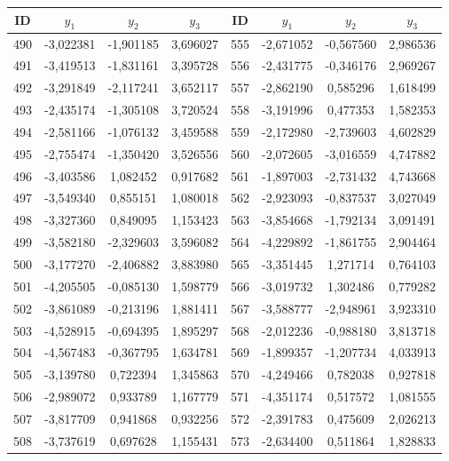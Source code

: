 \begin{apendicesenv}
\begin{table}[H]
	\centering
	\scriptsize
	\begin{tabular}{c c c c c c c c}
		\toprule
		 \centering \textbf{ID} & $y_1$ & $y_2$ & $y_3$ & \textbf{ID} & $y_1$ & $y_2$ & $y_3$ \\
		\midrule
		490 & -3,022381 & -1,901185 & 3,696027 & 555 & -2,671052 & -0,567560 & 2,986536 \\
		491 & -3,419513 & -1,831161 & 3,395728 & 556 & -2,431775 & -0,346176 & 2,969267 \\
		492 & -3,291849 & -2,117241 & 3,652117 & 557 & -2,862190 & 0,585296 & 1,618499 \\
		493 & -2,435174 & -1,305108 & 3,720524 & 558 & -3,191996 & 0,477353 & 1,582353 \\
		494 & -2,581166 & -1,076132 & 3,459588 & 559 & -2,172980 & -2,739603 & 4,602829 \\
		495 & -2,755474 & -1,350420 & 3,526556 & 560 & -2,072605 & -3,016559 & 4,747882 \\
		496 & -3,403586 & 1,082452 & 0,917682 & 561 & -1,897003 & -2,731432 & 4,743668 \\
		497 & -3,549340 & 0,855151 & 1,080018 & 562 & -2,923093 & -0,837537 & 3,027049 \\
		498 & -3,327360 & 0,849095 & 1,153423 & 563 & -3,854668 & -1,792134 & 3,091491 \\
		499 & -3,582180 & -2,329603 & 3,596082 & 564 & -4,229892 & -1,861755 & 2,904464 \\
		500 & -3,177270 & -2,406882 & 3,883980 & 565 & -3,351445 & 1,271714 & 0,764103 \\
		501 & -4,205505 & -0,085130 & 1,598779 & 566 & -3,019732 & 1,302486 & 0,779282 \\
		502 & -3,861089 & -0,213196 & 1,881411 & 567 & -3,588777 & -2,948961 & 3,923310 \\
		503 & -4,528915 & -0,694395 & 1,895297 & 568 & -2,012236 & -0,988180 & 3,813718 \\
		504 & -4,567483 & -0,367795 & 1,634781 & 569 & -1,899357 & -1,207734 & 4,033913 \\
		505 & -3,139780 & 0,722394 & 1,345863 & 570 & -4,249466 & 0,782038 & 0,927818 \\
		506 & -2,989072 & 0,933789 & 1,167779 & 571 & -4,351174 & 0,517572 & 1,081555 \\
		507 & -3,817709 & 0,941868 & 0,932256 & 572 & -2,391783 & 0,475609 & 2,026213 \\
		508 & -3,737619 & 0,697628 & 1,155431 & 573 & -2,634400 & 0,511864 & 1,828833 \\

\end{tabular}
\end{table}
\end{apendicesenv}
